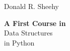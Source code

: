 \begin{titlepage} %

	\raggedleft %

	\vspace*{\baselineskip} %


	{\Large Donald R. Sheehy} %

	\vspace*{0.167\textheight} %


	\textbf{\LARGE A First Course in }\\[\baselineskip] %

	{\Huge Data Structures}\\[\baselineskip] %

	{\Large in Python} %

	\vfill %


\end{titlepage}
